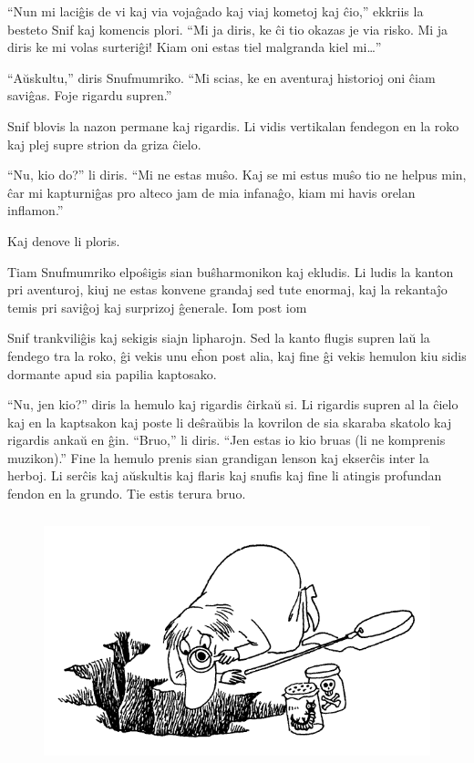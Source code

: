 ``Nun mi laciĝis de vi kaj via vojaĝado kaj viaj kometoj kaj ĉio,'' ekkriis la besteto Snif kaj komencis plori. ``Mi ja diris, ke ĉi tio okazas je via risko. Mi ja diris ke mi volas surteriĝi! Kiam oni estas tiel malgranda kiel mi{\ldots}''

``Aŭskultu,'' diris Snufmumriko. ``Mi scias, ke en aventuraj historioj oni ĉiam saviĝas. Foje rigardu supren.''

Snif blovis la nazon permane kaj rigardis. Li vidis vertikalan fendegon en la roko kaj plej supre strion da griza ĉielo.

``Nu, kio do?'' li diris. ``Mi ne estas muŝo. Kaj se mi estus muŝo tio ne helpus min, ĉar mi kapturniĝas pro alteco jam de mia infanaĝo, kiam mi havis orelan inflamon.''

Kaj denove li ploris.

Tiam Snufmumriko elpoŝigis sian buŝharmonikon kaj ekludis. Li ludis la kanton pri aventuroj, kiuj ne estas konvene grandaj sed tute enormaj, kaj la rekantaĵo temis pri saviĝoj kaj surprizoj ĝenerale. Iom post iom

Snif trankviliĝis kaj sekigis siajn lipharojn. Sed la kanto flugis supren laŭ la fendego tra la roko, ĝi vekis unu eĥon post alia, kaj fine ĝi vekis hemulon kiu sidis dormante apud sia papilia kaptosako.

``Nu, jen kio?'' diris la hemulo kaj rigardis ĉirkaŭ si. Li rigardis supren al la ĉielo kaj en la kaptsakon kaj poste li deŝraŭbis la kovrilon de sia skaraba skatolo kaj rigardis ankaŭ en ĝin. ``Bruo,'' li diris. ``Jen estas io kio bruas (li ne komprenis muzikon).'' Fine la hemulo prenis sian grandigan lenson kaj ekserĉis inter la herboj. Li serĉis kaj aŭskultis kaj flaris kaj snufis kaj fine li atingis profundan fendon en la grundo. Tie estis terura bruo.

\begin{figure}[htbp]
\centering
\includegraphics[width=350pt,height=206pt]{3-11.png}
\caption{}
\label{3-11}
\end{figure}

